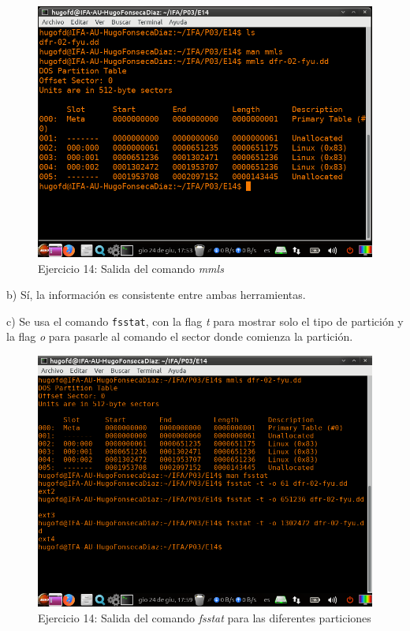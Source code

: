 \documentclass[11pt]{article}
\begin{document}
\begin{figure}[H]
    \caption{Ejercicio 14: Salida del comando \textit{mmls}}
    \centering
    \includegraphics[scale=0.7]{p03/e14-1.png}
\end{figure}

b) Sí, la información es consistente entre ambas herramientas.

c) Se usa el comando \verb|fsstat|, con la flag \textit{t} para mostrar solo el tipo de partición y la flag \textit{o} para pasarle al comando el sector donde comienza la partición.

\begin{figure}[H]
    \caption{Ejercicio 14: Salida del comando \textit{fsstat} para las diferentes particiones}
    \centering
    \includegraphics[scale=0.7]{p03/e14-2.png}
\end{figure}
\end{document}
